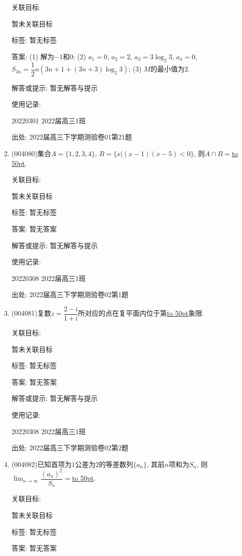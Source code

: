 \documentclass[10pt,a4paper]{article}
\newcommand{\blank}[1]{\underline{\hbox to #1pt{}}}
\begin{document}
\begin{enumerate}[1.]
关联目标:

暂未关联目标



标签: 暂无标签

答案: (1) 解为$-1$和$0$; (2) $a_1=0$, $a_2=2$, $a_3=3\log_2 3$, $a_4=0$, $S_{3n}=\dfrac 12 n(3n+1+(3n+3)\log_2 3)$; (3) $M$的最小值为$2$.

解答或提示: 暂无解答与提示

使用记录:

20220301	2022届高三1班			


出处: 2022届高三下学期测验卷01第21题
\item { (004080)}集合$A=\{1,2,3,4\}$, $B=\{x|(x-1)(x-5)<0\}$, 则$A\cap B=$\blank{50}.


关联目标:

暂未关联目标



标签: 暂无标签

答案: 暂无答案

解答或提示: 暂无解答与提示

使用记录:

20220308	2022届高三1班	


出处: 2022届高三下学期测验卷02第1题
\item { (004081)}复数$z=\dfrac{2-\mathrm{i}}{1+\mathrm{i}}$所对应的点在复平面内位于第\blank{50}象限.


关联目标:

暂未关联目标



标签: 暂无标签

答案: 暂无答案

解答或提示: 暂无解答与提示

使用记录:

20220308	2022届高三1班	


出处: 2022届高三下学期测验卷02第2题
\item { (004082)}已知首项为$1$公差为$2$的等差数列$\{a_n\}$, 其前$n$项和为$S_n$, 则$\displaystyle\lim_{n\to \infty}\dfrac{(a_n)^2}{S_n}=$\blank{50}.


关联目标:

暂未关联目标



标签: 暂无标签

答案: 暂无答案


\end{enumerate}
\end{document}
